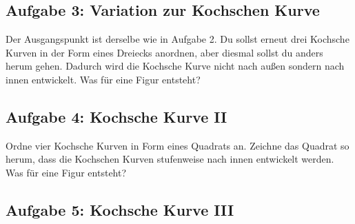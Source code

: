 \subsection{Aufgabe 3: Variation zur Kochschen Kurve}

Der Ausgangspunkt ist derselbe wie in Aufgabe 2. Du sollst erneut drei Kochsche
Kurven in der Form eines Dreiecks anordnen, aber diesmal sollst du anders herum
gehen. Dadurch wird die Kochsche Kurve nicht nach außen sondern nach innen
entwickelt. Was für eine Figur entsteht?


\subsection{Aufgabe 4: Kochsche Kurve II}

Ordne vier Kochsche Kurven in Form eines Quadrats an. Zeichne das Quadrat so
herum, dass die Kochschen Kurven stufenweise nach innen entwickelt werden. Was
für eine Figur entsteht?


\subsection{Aufgabe 5: Kochsche Kurve III}

